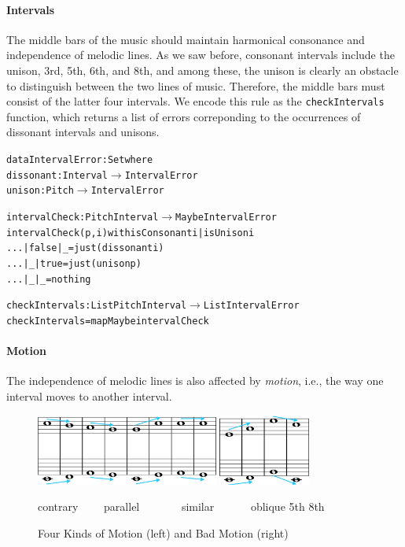 \paragraph{Intervals}

The middle bars of the music should maintain harmonical consonance
and independence of melodic lines.
As we saw before, consonant intervals include the unison, 3rd, 5th,
6th, and 8th, and among these, the unison is clearly an obstacle to
distinguish between the two lines of music.
Therefore, the middle bars must consist of the latter four intervals.
We encode this rule as the \texttt{checkIntervals} function, which
returns a list of errors correponding to the occurrences of dissonant
intervals and unisons.

\begin{alltt}
data IntervalError : Set where
  dissonant : Interval \(\rightarrow\) IntervalError
  unison    : Pitch \(\rightarrow\) IntervalError

intervalCheck : PitchInterval \(\rightarrow\) Maybe IntervalError
intervalCheck (p , i) with isConsonant i | isUnison i
... | false | _    = just (dissonant i)
... | _     | true = just (unison p)
... | _     | _    = nothing

checkIntervals : List PitchInterval \(\rightarrow\) List IntervalError
checkIntervals = mapMaybe intervalCheck
\end{alltt}

\paragraph{Motion}

The independence of melodic lines is also affected by \emph{motion},
i.e., the way one interval moves to another interval.

\begin{figure}
    \includegraphics[width=6cm]{fig/motion.png}
    \hspace{1cm}
    \includegraphics[width=3cm]{fig/badmotion.png} \\
    \begin{flushleft}
    \begin{small}
      \hspace{1.95cm} contrary \ \ \ \ parallel \ \ \ \ \ \ \ similar \ \ \ \ \ \ oblique
      \hspace{2.2cm} 5th \hspace{9.5mm} 8th
    \end{small}
    \end{flushleft}
    \caption{Four Kinds of Motion (left) and Bad Motion (right)}
    \label{fig:motion}
  \end{figure}

